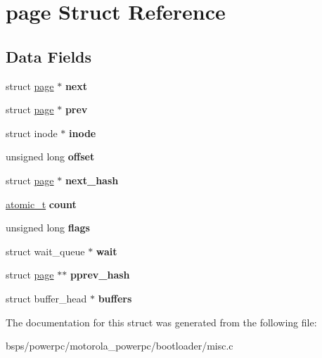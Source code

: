 \hypertarget{structpage}{}\section{page Struct Reference}
\label{structpage}
\subsection*{Data Fields}
\begin{DoxyCompactItemize}
\item 
\mbox{\label{structpage_a27ff7807791328e47d47e37660eb53e0}} 
struct \mbox{\hyperlink{structpage}{page}} $\ast$ {\bfseries next}
\item 
\mbox{\label{structpage_aac5ae2cb924ad9d37398cb57c3eb20cd}} 
struct \mbox{\hyperlink{structpage}{page}} $\ast$ {\bfseries prev}
\item 
\mbox{\label{structpage_aef751e64bc4566cf02a97eee43c4297a}} 
struct inode $\ast$ {\bfseries inode}
\item 
\mbox{\label{structpage_a7e98ece202cfc3f567cf8d451b1a87aa}} 
unsigned long {\bfseries offset}
\item 
\mbox{\label{structpage_ac919b208f927f674c6c6e053e6298304}} 
struct \mbox{\hyperlink{structpage}{page}} $\ast$ {\bfseries next\+\_\+hash}
\item 
\mbox{\label{structpage_a8871d572cfcaeba5191d5017f914a328}} 
\mbox{\hyperlink{structatomic__t}{atomic\+\_\+t}} {\bfseries count}
\item 
\mbox{\label{structpage_a169ccf889696fc11bcd61520d81e1d5c}} 
unsigned long {\bfseries flags}
\item 
\mbox{\label{structpage_acab0a5f283cf7a753c7039c386263580}} 
struct wait\+\_\+queue $\ast$ {\bfseries wait}
\item 
\mbox{\label{structpage_ab5331be855ade2bb20f4d4d205ce4bc9}} 
struct \mbox{\hyperlink{structpage}{page}} $\ast$$\ast$ {\bfseries pprev\+\_\+hash}
\item 
\mbox{\label{structpage_a0676150798fe228c7c008a158c58cfa1}} 
struct buffer\+\_\+head $\ast$ {\bfseries buffers}
\end{DoxyCompactItemize}


The documentation for this struct was generated from the following file\+:\begin{DoxyCompactItemize}
\item 
bsps/powerpc/motorola\+\_\+powerpc/bootloader/misc.\+c\end{DoxyCompactItemize}
